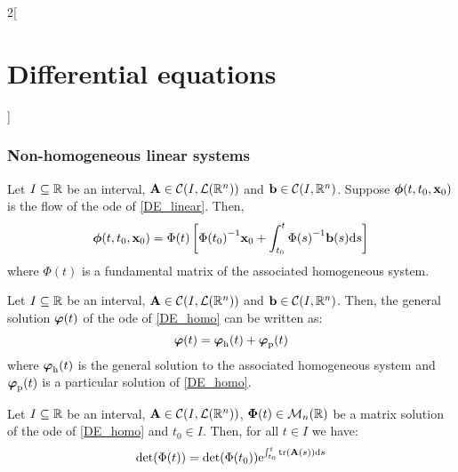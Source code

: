 \documentclass[../../../main.tex]{subfiles}
\begin{document}
\begin{multicols}{2}[\section{Differential equations}]
  \subsubsection{Non-homogeneous linear systems}
  \begin{prop}
    Let $I\subseteq \mathbb{R}$ be an interval, $\boldsymbol{\mathrm{A}}\in\mathcal{C}(I,\mathcal{L}(\mathbb{R}^n))$ and $\boldsymbol{\mathrm{b}}\in\mathcal{C}(I,\mathbb{R}^n)$. Suppose $\boldsymbol{\mathrm{\phi}}(t,t_0,\boldsymbol{\mathrm{x}}_0)$ is the flow of the ode of \cref{DE_linear}. Then, $$\boldsymbol{\mathrm{\phi}}(t,t_0,\boldsymbol{\mathrm{x}}_0)=\Phi(t)\left[{\Phi(t_0)}^{-1}\boldsymbol{\mathrm{x}}_0+\int_{t_0}^t{\Phi(s)}^{-1}\boldsymbol{\mathrm{b}}(s)\dd s\right]$$ where $\Phi(t)$ is a fundamental matrix of the associated homogeneous system.
  \end{prop}
  \begin{corollary}
    Let $I\subseteq \mathbb{R}$ be an interval, $\boldsymbol{\mathrm{A}}\in\mathcal{C}(I,\mathcal{L}(\mathbb{R}^n))$ and $\boldsymbol{\mathrm{b}}\in\mathcal{C}(I,\mathbb{R}^n)$. Then, the general solution $\boldsymbol{\mathrm{\varphi}}(t)$ of the ode of \cref{DE_homo} can be written as: $$\boldsymbol{\mathrm{\varphi}}(t)=\boldsymbol{\mathrm{\varphi}}_\mathrm{h}(t)+\boldsymbol{\mathrm{\varphi}}_\mathrm{p}(t)$$ where $\boldsymbol{\mathrm{\varphi}}_\mathrm{h}(t)$ is the general solution to the associated homogeneous system and $\boldsymbol{\mathrm{\varphi}}_\mathrm{p}(t)$ is a particular solution of \cref{DE_homo}.
  \end{corollary}
  \begin{prop}
    Let $I\subseteq \mathbb{R}$ be an interval, $\boldsymbol{\mathrm{A}}\in\mathcal{C}(I,\mathcal{L}(\mathbb{R}^n))$, $\boldsymbol{\mathrm{\Phi}}(t)\in\mathcal{M}_n(\mathbb{R})$ be a matrix solution of the ode of \cref{DE_homo} and $t_0\in I$. Then, for all $t\in I$ we have: $$\det(\Phi(t))=\det (\Phi(t_0))\exp{\int_{t_0}^t\trace(\vf{A}(s))\dd s}$$
  \end{prop}

\end{multicols}
\end{document}
